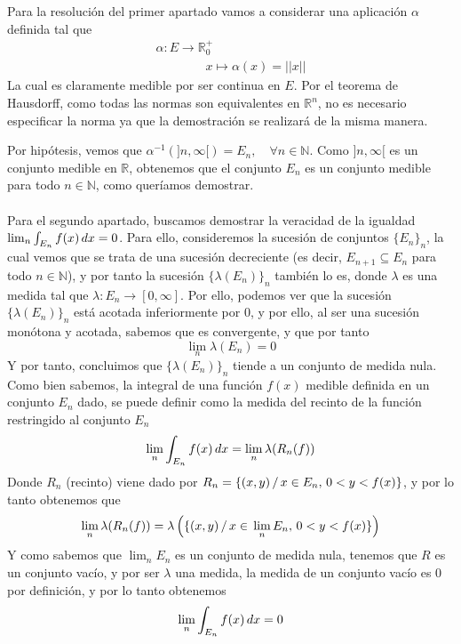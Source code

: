 \documentclass[fleqn]{article}
\def\R{\mathds{R}}
\def\N{\mathds{N}}
\begin{document}
    Para la resolución del primer apartado vamos a considerar una aplicación $\alpha$ definida tal que
    \begin{equation*}
        \begin{aligned}
            \alpha : E\longrightarrow \R_0^+ \quad \quad\\
            \quad \quad \quad \quad x \longmapsto \alpha(x)=||x||
        \end{aligned}
    \end{equation*}
    La cual es claramente medible por ser continua en $E$. Por el teorema de Hausdorff, como todas las normas son equivalentes en $\R^n$,
    no es necesario especificar la norma ya que la demostración se realizará de la misma manera.

    Por hipótesis, vemos que $\alpha^{-1} (]n,\infty[) = E_n, \quad \forall n \in \N$. Como $]n,\infty[$ es un conjunto medible en $\R$, obtenemos que
    el conjunto $E_n$ es un conjunto medible para todo $n \in \N$, como queríamos demostrar.\\ \\

    Para el segundo apartado, buscamos demostrar la veracidad de la igualdad $\lim_n \int_{E_n} f(x) \thinspace dx = 0$. Para ello, consideremos
    la sucesión de conjuntos $\{E_n\}_n$, la cual vemos que se trata de una sucesión decreciente (es decir, $E_{n+1} \subseteq E_n$ para todo $n \in \N$),
    y por tanto la sucesión $\{\lambda(E_n)\}_n$ también lo es, donde $\lambda$ es una medida tal que $\lambda : E_n \rightarrow [0,\infty]$. 
    Por ello, podemos ver que la sucesión $\{\lambda(E_n)\}_n$ está acotada inferiormente por $0$, y por ello, al ser una sucesión monótona y 
    acotada, sabemos que es convergente, y que por tanto
    $$\lim_n \lambda(E_n) = 0$$
    Y por tanto, concluimos que $\{\lambda(E_n)\}_n$ tiende a un conjunto de medida nula. Como bien sabemos, la integral de una función $f(x)$
    medible definida en un conjunto $E_n$ dado, se puede definir como la medida del recinto de la función restringido al conjunto $E_n$
    $$\lim_n \int_{E_n} f(x) \thinspace dx = \lim_n \lambda(R_n(f))$$
    Donde $R_n$ (recinto) viene dado por $R_n = \{(x,y) \thinspace / \thinspace x\in E_n, \thinspace 0<y<f(x)\}$, y por lo tanto obtenemos que
    $$\lim_n \lambda(R_n(f)) = \lambda\left(\{(x,y) \thinspace / \thinspace x\in \thinspace \lim_n E_n, \thinspace 0<y<f(x)\}\right)$$
    Y como sabemos que $\lim_n E_n$ es un conjunto de medida nula, tenemos que $R$ es un conjunto vacío, y por ser $\lambda$ una medida, 
    la medida de un conjunto vacío es $0$ por definición, y por lo tanto obtenemos
    $$\lim_n \int_{E_n} f(x) \thinspace dx = 0$$
\end{document}
